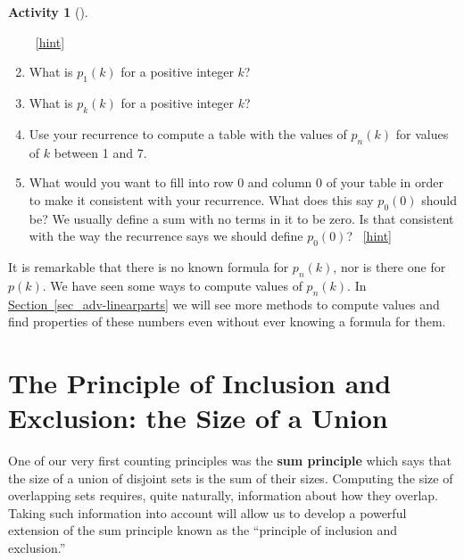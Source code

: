 \documentclass[10pt,]{book}
\newcommand{\terminology}[1]{\textbf{#1}}
\theoremstyle{plain}
\theoremstyle{definition}
\theoremstyle{definition}
\theoremstyle{definition}
\newtheorem{activity}[project]{Activity}
\numberwithin{equation}{chapter}
\begin{document}
\begin{activity}[]
\begin{enumerate}[font=\bfseries,label=(\alph*),ref=\alph*]
~\hfill{\tiny\hyperlink{a-153.d}{[hint]}\hypertarget{q-153.d}{}}\item\label{task-152} \hypertarget{p-740}{}%
What is \(p_1(k)\) for a positive integer \(k\)?%
\item\label{task-153} \hypertarget{p-742}{}%
What is \(p_k(k)\) for a positive integer \(k\)?%
\item\label{task-154} \hypertarget{p-744}{}%
Use your recurrence to compute a table with the values of \(p_n(k)\) for values of \(k\) between 1 and 7.%
\item\label{task-155} \hypertarget{p-745}{}%
What would you want to fill into row 0 and column 0 of your table in order to make it consistent with your recurrence.  What does this say \(p_0(0)\) should be?  We usually define a sum with no terms in it to be zero. Is that consistent with the way the recurrence says we should define \(p_0(0)\)?%
~\hfill{\tiny\hyperlink{a-153.h}{[hint]}\hypertarget{q-153.h}{}}\end{enumerate}
\end{activity}
\hypertarget{p-748}{}%
It is remarkable that there is no known formula for \(p_n(k)\), nor is there one for \(p(k)\). We have seen some ways to compute values of \(p_n(k)\).  In \hyperref[sec_adv-linearparts]{Section~\ref{sec_adv-linearparts}} we will see more methods to compute values and find properties of these numbers even without ever knowing a formula for them.%
\typeout{************************************************}
\typeout{************************************************}
\section[{The Principle of Inclusion and Exclusion: the Size of a Union}]{The Principle of Inclusion and Exclusion: the Size of a Union}\label{sec_adv-pie}
\hypertarget{p-749}{}%
One of our very first counting principles was the \terminology{sum principle} which says that the size of a union of disjoint sets is the sum of their sizes. Computing the size of overlapping sets requires, quite naturally, information about how they overlap. Taking such information into account will allow us to develop a powerful extension of the sum principle known as the ``principle of inclusion and exclusion.''%
\typeout{************************************************}
\typeout{************************************************}
\end{document}
